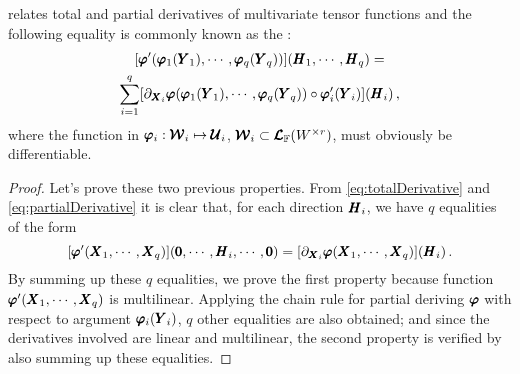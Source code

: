 relates total and partial derivatives of multivariate tensor functions and the following equality is commonly known as the :
\begin{multline}\label{eq:chainRulePartial}
[\pmb{\varphi}'(\pmb{\varphi}_1(\pmb{Y}_1),\cdots,\pmb{\varphi}_q(\pmb{Y}_q))](\pmb{H}_1,\cdots,\pmb{H}_q)=\\
\sum_{i=1}^{q}[\partial_{\pmb{X}_i}\pmb{\varphi}(\pmb{\varphi}_1(\pmb{Y}_1),\cdots,\pmb{\varphi}_q(\pmb{Y}_q))\circ\pmb{\varphi}_i'(\pmb{Y}_i)]{(\pmb{H}_i)}\,,
\end{multline}
where the function in $\pmb{\varphi}_i : {\pmb{\mathcal{W}}_i} \mapsto \pmb{\mathcal{U}}_i$, ${\pmb{\mathcal{W}}_i}\subset\pmb{\mathcal{L}}_{\mathbb{F}}(W^{\times r})$, must obviously be differentiable.

{\footnotesize
\begin{proof}
Let's prove these two previous properties. From \eqref{eq:totalDerivative} and \eqref{eq:partialDerivative} it is clear that, for each direction $\pmb{H}_i$, we have $q$ equalities of the form
\begin{equation*}
[\pmb{\varphi}'(\pmb{X}_1,\cdots,\pmb{X}_q)](\pmb{0},\cdots,\pmb{H}_i,\cdots,\pmb{0})=[\partial_{\pmb{X}_i}\pmb{\varphi}(\pmb{X}_1,\cdots,\pmb{X}_q)]{(\pmb{H}_i)}\,.
\end{equation*}
By summing up these $q$ equalities, we prove the first property because function $\pmb{\varphi}'(\pmb{X}_1,\cdots,\pmb{X}_q)$ is multilinear. Applying the chain rule for partial deriving $\pmb{\varphi}$ with respect to argument $\pmb{\varphi}_i(\pmb{Y}_i)$,  $q$ other equalities are also obtained; and since the derivatives involved are linear and multilinear, the second property is verified by also summing up these equalities. 
\end{proof}}

